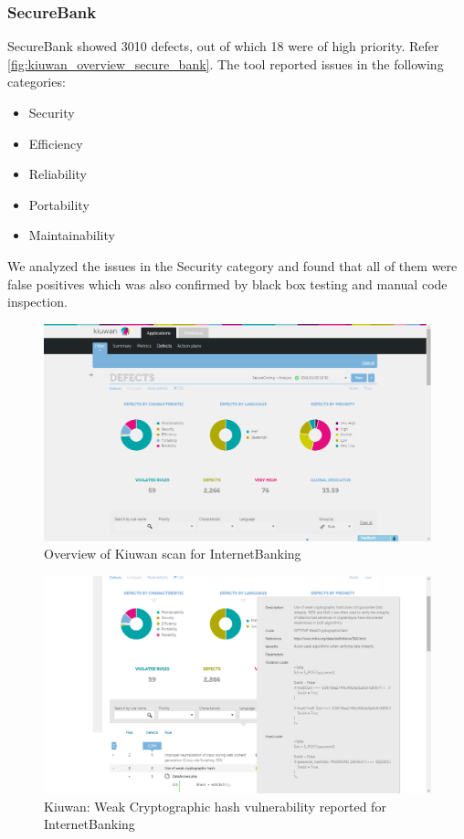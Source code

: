 \subsubsection{SecureBank}
SecureBank showed 3010 defects, out of which 18 were of high priority. Refer \ref{fig:kiuwan_overview_secure_bank}. The tool reported issues in the following categories:
\begin{itemize}
    \item Security
    \item Efficiency
    \item Reliability
    \item Portability
    \item Maintainability
\end{itemize}
We analyzed the issues in the Security category and found that all of them were false positives which was also confirmed by black box testing and manual code inspection.

\begin{figure}[ht]
	\centering
	\includegraphics[width=.8\linewidth]{figures/kiuwan_overview.png}
	\caption{Overview of Kiuwan scan for InternetBanking}
	\label{fig:kiuwan_overview}
\end{figure}

\begin{figure}[ht]
	\centering
	\includegraphics[width=.8\linewidth]{figures/kiuwan_weak_hash.png}
	\caption{Kiuwan: Weak Cryptographic hash vulnerability reported for InternetBanking}
	\label{fig:kiuwan_weak_hash}
\end{figure}

